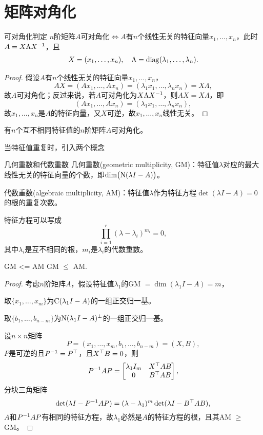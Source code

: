 \section{矩阵对角化}
\begin{theorem}{可对角化判定}{}
	$n$阶矩阵$A$可对角化$\iff A$有$n$个线性无关的特征向量$x_1,\ldots,x_n$，此时$A=X\Lambda X^{-1}$，且 
	\begin{align}
		X=(x_1,\ldots,x_n),\quad\Lambda=\operatorname{diag}(\lambda_1,\ldots,\lambda_n).
	\end{align}
\end{theorem}
\begin{proof}
	假设$A$有$n$个线性无关的特征向量$x_1,\ldots,x_n$，
	\[
		AX=(Ax_1,\ldots,Ax_n)=(\lambda_1x_1,\ldots,\lambda_nx_n)=X\Lambda,
	\]
	故$A$可对角化；反过来说，若$A$可对角化为$X\Lambda X^{-1}$，则$AX=X\Lambda$，即
	\[
		(Ax_1,\ldots,Ax_n)=(\lambda_1x_1,\ldots,\lambda_nx_n),
	\]
	故$x_1,\ldots,x_n$是$A$的特征向量，又$X$可逆，故$x_1,\ldots,x_n$线性无关。
\end{proof}
\begin{corollary}
	有$n$个互不相同特征值的$n$阶矩阵$A$可对角化。
\end{corollary}
当特征值重复时，引入两个概念
\begin{definition}{几何重数和代数重数}{}
	几何重数(geometric multiplicity, GM)：特征值$\lambda$对应的最大线性无关的特征向量的个数，即$\dim\bigl(\operatorname{N}(\lambda I-A)\bigr)$。

	代数重数(algebraic multiplicity, AM)：特征值$\lambda$作为特征方程$\det(\lambda I-A)=0$的根的重复次数。
\end{definition}
特征方程可以写成
\[
	\prod_{i=1}^r(\lambda-\lambda_i)^{m_i}=0,
\]
其中$\lambda_i$是互不相同的根，$m_i$是$\lambda_i$的代数重数。
\begin{theorem}{}{GM <= AM}
	GM $\leqslant$ AM.
\end{theorem}
\begin{proof}
	考虑$n$阶矩阵$A$，假设特征值$\lambda_1$的GM $=\dim(\lambda_1I-A)=m$，
	
	取$\{x_1,\ldots,x_m\}$为$\operatorname{C}(\lambda_1I-A)$的一组正交归一基。
	
	取$\{b_1,\ldots,b_{n-m}\}$为$\operatorname{N}(\lambda_1I-A)^\perp$的一组正交归一基。
	
	设$n\times n$矩阵 
	\[
		P=(x_1,\ldots,x_m,b_1,\ldots,b_{n-m})=(X,B),
	\]
	$P$是可逆的且$P^{-1}=P^\top$，且$X^\top B=0$，则 
	\[
		P^{-1} AP=\begin{bmatrix}
			\lambda_1I_m&X^\top AB\\0&B^\top AB
		\end{bmatrix},
	\]
	分块三角矩阵
	\[
		\det(\lambda I-P^{-1} AP)=(\lambda-\lambda_1)^m\det(\lambda I-B^\top AB),
	\]
	$A$和$P^{-1} AP$有相同的特征方程，故$\lambda_1$必然是$A$的特征方程的根，且其AM $\geqslant$ GM。
\end{proof}
